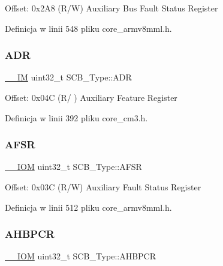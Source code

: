 Offset\+: 0x2\+A8 (R/W) Auxiliary Bus Fault Status Register 

Definicja w linii 548 pliku core\+\_\+armv8mml.\+h.

\mbox{\label{struct_s_c_b___type_af084e1b2dad004a88668efea1dfe7fa1}} 
\subsubsection{\texorpdfstring{A\+DR}{ADR}}
{\footnotesize\ttfamily \hyperlink{core__sc300_8h_a4cc1649793116d7c2d8afce7a4ffce43}{\+\_\+\+\_\+\+IM} uint32\+\_\+t S\+C\+B\+\_\+\+Type\+::\+A\+DR}

Offset\+: 0x04C (R/ ) Auxiliary Feature Register 

Definicja w linii 392 pliku core\+\_\+cm3.\+h.

\mbox{\label{struct_s_c_b___type_ab65372404ce64b0f0b35e2709429404e}} 
\subsubsection{\texorpdfstring{A\+F\+SR}{AFSR}}
{\footnotesize\ttfamily \hyperlink{core__sc300_8h_ab6caba5853a60a17e8e04499b52bf691}{\+\_\+\+\_\+\+I\+OM} uint32\+\_\+t S\+C\+B\+\_\+\+Type\+::\+A\+F\+SR}

Offset\+: 0x03C (R/W) Auxiliary Fault Status Register 

Definicja w linii 512 pliku core\+\_\+armv8mml.\+h.

\mbox{\label{struct_s_c_b___type_a0d53bcea294422b5b4ecfdcd9cdc1773}} 
\subsubsection{\texorpdfstring{A\+H\+B\+P\+CR}{AHBPCR}}
{\footnotesize\ttfamily \hyperlink{core__sc300_8h_ab6caba5853a60a17e8e04499b52bf691}{\+\_\+\+\_\+\+I\+OM} uint32\+\_\+t S\+C\+B\+\_\+\+Type\+::\+A\+H\+B\+P\+CR}


